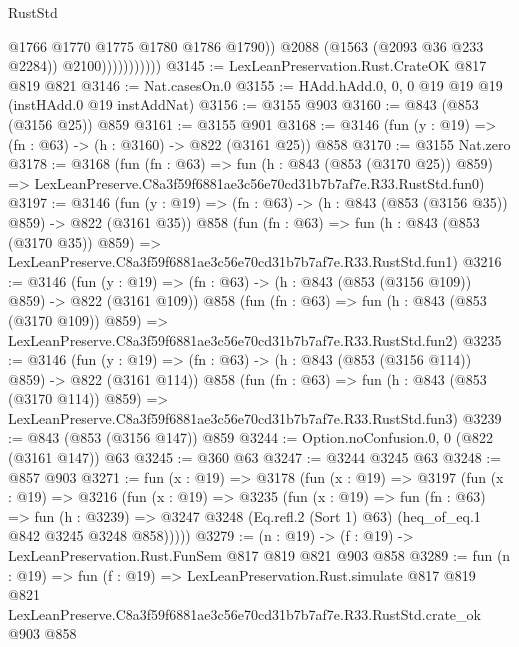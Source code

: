 \begin{lexlean}{RustStd}
\begin{coremodule}
                              @1766
                              @1770
                              @1775
                              @1780
                              @1786
                              @1790))
                          @2088
                          (@1563 (@2093 @36 @233 @2284))
                          @2100)))))))))))
@3145 := LexLeanPreservation.Rust.CrateOK @817 @819 @821
@3146 := Nat.casesOn.{0}
@3155 := HAdd.hAdd.{0, 0, 0} @19 @19 @19 (instHAdd.{0} @19 instAddNat)
@3156 := @3155 @903
@3160 := @843 (@853 (@3156 @25)) @859
@3161 := @3155 @901
@3168 := @3146 (fun (y : @19) => (fn : @63) -> (h : @3160) -> @822 (@3161 @25)) @858
@3170 := @3155 Nat.zero
@3178 := @3168
    (fun (fn : @63) =>
    fun (h : @843 (@853 (@3170 @25)) @859) =>
    LexLeanPreserve.C8a3f59f6881ae3c56e70cd31b7b7af7e.R33.RustStd.fun0)
@3197 := @3146
    (fun (y : @19) => (fn : @63) -> (h : @843 (@853 (@3156 @35)) @859) -> @822 (@3161 @35))
    @858
    (fun (fn : @63) =>
    fun (h : @843 (@853 (@3170 @35)) @859) =>
    LexLeanPreserve.C8a3f59f6881ae3c56e70cd31b7b7af7e.R33.RustStd.fun1)
@3216 := @3146
    (fun (y : @19) => (fn : @63) -> (h : @843 (@853 (@3156 @109)) @859) -> @822 (@3161 @109))
    @858
    (fun (fn : @63) =>
    fun (h : @843 (@853 (@3170 @109)) @859) =>
    LexLeanPreserve.C8a3f59f6881ae3c56e70cd31b7b7af7e.R33.RustStd.fun2)
@3235 := @3146
    (fun (y : @19) => (fn : @63) -> (h : @843 (@853 (@3156 @114)) @859) -> @822 (@3161 @114))
    @858
    (fun (fn : @63) =>
    fun (h : @843 (@853 (@3170 @114)) @859) =>
    LexLeanPreserve.C8a3f59f6881ae3c56e70cd31b7b7af7e.R33.RustStd.fun3)
@3239 := @843 (@853 (@3156 @147)) @859
@3244 := Option.noConfusion.{0, 0} (@822 (@3161 @147)) @63
@3245 := @360 @63
@3247 := @3244 @3245 @63
@3248 := @857 @903
@3271 := fun (x : @19) =>
  @3178
    (fun (x : @19) =>
    @3197
      (fun (x : @19) =>
      @3216
        (fun (x : @19) =>
        @3235
          (fun (x : @19) =>
          fun (fn : @63) =>
          fun (h : @3239) =>
          @3247 @3248 (Eq.refl.{2} (Sort 1) @63) (heq_of_eq.{1} @842 @3245 @3248 @858)))))
@3279 := (n : @19) -> (f : @19) -> LexLeanPreservation.Rust.FunSem @817 @819 @821 @903 @858
@3289 := fun (n : @19) =>
  fun (f : @19) =>
  LexLeanPreservation.Rust.simulate
    @817
    @819
    @821
    LexLeanPreserve.C8a3f59f6881ae3c56e70cd31b7b7af7e.R33.RustStd.crate_ok
    @903
    @858
\end{coremodule}
\end{lexlean}
